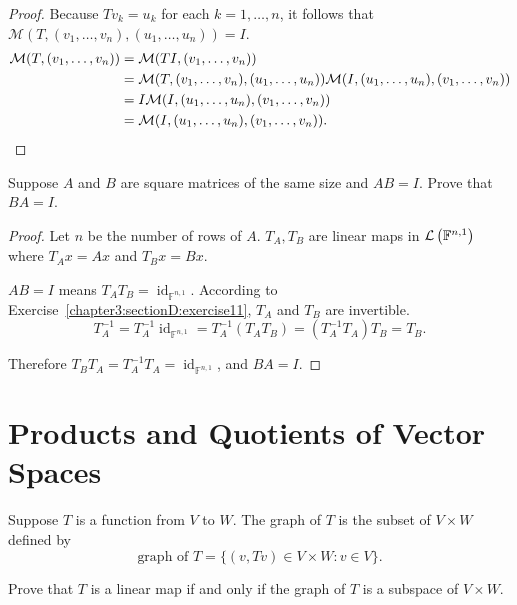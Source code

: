 \begin{proof}
    Because $Tv_{k} = u_{k}$ for each $k = 1,\ldots, n$, it follows that $\mathcal{M}(T, (v_{1}, \ldots, v_{n}), (u_{1}, \ldots, u_{n})) = I$.
    \begin{align*}
        \mathcal{M}(T, (v_{1}, \ldots, v_{n})) & = \mathcal{M}(TI, (v_{1}, \ldots, v_{n}))                                                                                      \\
                                               & = \mathcal{M}(T, (v_{1}, \ldots, v_{n}), (u_{1}, \ldots, u_{n}))\mathcal{M}(I, (u_{1}, \ldots, u_{n}), (v_{1}, \ldots, v_{n})) \\
                                               & = I\mathcal{M}(I, (u_{1}, \ldots, u_{n}), (v_{1}, \ldots, v_{n}))                                                              \\
                                               & = \mathcal{M}(I, (u_{1}, \ldots, u_{n}), (v_{1}, \ldots, v_{n})).\qedhere
    \end{align*}
\end{proof}
\newpage

\begin{exercise}
    Suppose $A$ and $B$ are square matrices of the same size and $AB = I$. Prove that $BA = I$.
\end{exercise}

\begin{proof}
    Let $n$ be the number of rows of $A$. $T_{A}, T_{B}$ are linear maps in $\mathcal{L}\left({\mathbb{F}^{n,1}}\right)$ where $T_{A}x = Ax$ and $T_{B}x = Bx$.

    $AB = I$ means $T_{A}T_{B} = \operatorname{id}_{\mathbb{F}^{n,1}}$. According to Exercise~\ref{chapter3:sectionD:exercise11}, $T_{A}$ and $T_{B}$ are invertible.
    \[
        T^{-1}_{A} = T^{-1}_{A}\operatorname{id}_{\mathbb{F}^{n,1}} = T^{-1}_{A}(T_{A}T_{B}) = (T^{-1}_{A}T_{A})T_{B} = T_{B}.
    \]

    Therefore $T_{B}T_{A} = T^{-1}_{A}T_{A} = \operatorname{id}_{\mathbb{F}^{n,1}}$, and $BA = I$.
\end{proof}
\newpage

\section{Products and Quotients of Vector Spaces}

\begin{exercise}
    Suppose $T$ is a function from $V$ to $W$. The graph of $T$ is the subset of $V\times W$ defined by
    \[
        \text{graph of $T$} = \{ (v, Tv)\in V\times W: v\in V \}.
    \]

    Prove that $T$ is a linear map if and only if the graph of $T$ is a subspace of $V\times W$.
\end{exercise}


